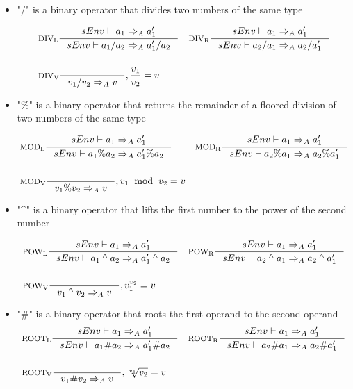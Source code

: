 \begin{itemize}
\item "/" is a binary operator that divides two numbers of the same type

\begin{align*}
&\inference[$\text{DIV}_\text{L}$]{sEnv\vdash a_1 \Rightarrow_A a_1'}
                    {sEnv\vdash a_1 / a_2 \Rightarrow_A a_1' / a_2}
&
&\inference[$\text{DIV}_\text{R}$]{sEnv\vdash a_1 \Rightarrow_A a_1'}
                    {sEnv\vdash a_2 / a_1 \Rightarrow_A a_2 / a_1'}
\\\\
&\inference[$\text{DIV}_\text{V}$]{}
                    {v_1 / v_2 \Rightarrow_A v}
                    {, \frac{v_1}{v_2} = v}
\end{align*}

\item "\%" is a binary operator that returns the remainder of a floored division of two numbers of the same type

\begin{align*}
&\inference[$\text{MOD}_\text{L}$]{sEnv\vdash a_1 \Rightarrow_A a_1'}
                    {sEnv\vdash a_1 \% a_2 \Rightarrow_A a_1' \% a_2}
&
&\inference[$\text{MOD}_\text{R}$]{sEnv\vdash a_1 \Rightarrow_A a_1'}
                    {sEnv\vdash a_2 \% a_1 \Rightarrow_A a_2 \% a_1'}
\\\\
&\inference[$\text{MOD}_\text{V}$]{}
                    {v_1 \% v_2 \Rightarrow_A v}
                    {, v_1 \;\; \textrm{mod} \;\; v_2 = v}
\end{align*}

\item "\^{}" is a binary operator that lifts the first number to the power of the second number

\begin{align*}
&\inference[$\text{POW}_\text{L}$]{sEnv\vdash a_1  \Rightarrow_A a_1'}
                    {sEnv\vdash a_1 \Twedge a_2 \Rightarrow_A a_1' \Twedge a_2}
&
&\inference[$\text{POW}_\text{R}$]{sEnv\vdash a_1 \Rightarrow_A a_1'}
                    {sEnv\vdash a_2 \Twedge a_1 \Rightarrow_A a_2 \Twedge a_1'}
\\\\
&\inference[$\text{POW}_\text{V}$]{}
                    {v_1 \Twedge v_2 \Rightarrow_A v}
                    {, v_1 ^ {v_2} = v}
\end{align*}

\item "\#" is a binary operator that roots the first operand to the second operand
\begin{align*}
&\inference[$\text{ROOT}_\text{L}$]{sEnv\vdash a_1 \Rightarrow_A a_1'}
                    {sEnv\vdash a_1 \# a_2 \Rightarrow_A a_1' \# a_2}
&
&\inference[$\text{ROOT}_\text{R}$]{sEnv\vdash a_1 \Rightarrow_A a_1'}
                    {sEnv\vdash a_2 \# a_1 \Rightarrow_A a_2 \# a_1'}
\\\\
&\inference[$\text{ROOT}_\text{V}$]{}
                    {v_1 \# v_2 \Rightarrow_A v}
                    {, \sqrt[v_1]{v_2} = v}
\end{align*}


\end{itemize}
